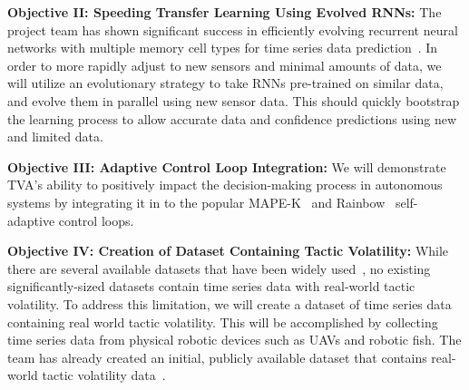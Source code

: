 \documentclass[12pt]{article}
\newcommand{\etc}{etc.\xspace}
\begin{document}
\vspace{2mm} \noindent \textbf{Objective II: Speeding Transfer Learning Using Evolved RNNs: } The project team has shown significant success in efficiently evolving recurrent neural networks with multiple memory cell types for time series data prediction~\cite{desell-exalt-coal-2019,desell-gecco-examm-2019}. In order to more rapidly adjust to new sensors and minimal amounts of data, we will utilize an evolutionary strategy to take RNNs pre-trained on similar data, and evolve them in parallel using new sensor data.  This should quickly bootstrap the learning process to allow accurate data and confidence predictions using new and limited data.



\vspace{2mm} \noindent \textbf{Objective III: Adaptive Control Loop Integration: }We will demonstrate TVA's ability to positively impact the decision-making process in autonomous systems by integrating it in to the popular MAPE-K~\cite{kephart2003vision} and Rainbow~\cite{garlan2004rainbow} self-adaptive control loops. %

\vspace{2mm} \noindent \textbf{Objective IV: Creation of Dataset Containing Tactic Volatility: }While there are several available datasets that have been widely used~\cite{SEAMS_Artifacts_URL, traffic_Archive_URL}, no existing significantly-sized datasets contain time series data with real-world tactic volatility. %
To address this limitation, we will create a dataset of time series data containing real world tactic volatility. This will be accomplished by collecting time series data from physical robotic devices such as UAVs and robotic fish. %
The team has already created an initial, publicly available dataset that contains real-world tactic volatility data~\cite{VALET_TOOL_URL}.

\end{document}
